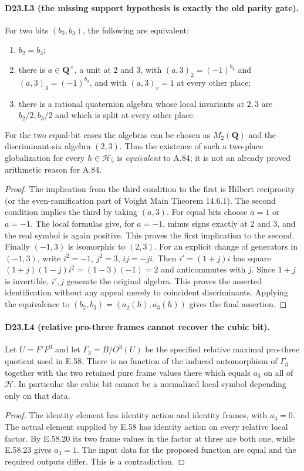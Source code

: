 \paragraph{D23.L3 (the missing support hypothesis is exactly the old parity gate).}
For two bits $(b_2,b_3)$, the following are equivalent:
\begin{enumerate}
\item $b_2=b_3$;
\item there is $a\in\mathbf Q^\times$, a unit at $2$ and $3$, with
$(a,3)_2=(-1)^{b_2}$ and $(a,3)_3=(-1)^{b_3}$, and with
$(a,3)_v=1$ at every other place;
\item there is a rational quaternion algebra whose local invariants
at $2,3$ are $b_2/2,b_3/2$ and which is split at every other place.
\end{enumerate}
For the two equal-bit cases the algebras can be chosen as
$M_2(\mathbf Q)$ and the discriminant-six algebra $(2,3)$.
Thus the existence of such a two-place globalization for every
$h\in\mathcal H_5$ is \emph{equivalent} to A.84; it is not an
already proved arithmetic reason for A.84.
\begin{proof}
The implication from the third condition to the first is Hilbert
reciprocity (or the even-ramification part of Voight Main Theorem
14.6.1). The second condition implies the third by taking $(a,3)$.
For equal bits choose $a=1$ or $a=-1$. The local formulas give,
for $a=-1$, minus signs exactly at $2$ and $3$, and the real symbol
is again positive. This proves the first implication to the second.
Finally $(-1,3)$ is isomorphic to $(2,3)$. For an explicit change
of generators in $(-1,3)$, write $i^2=-1$, $j^2=3$, $ij=-ji$.
Then $i'=(1+j)i$ has square
$(1+j)(1-j)i^2=(1-3)(-1)=2$ and anticommutes with $j$.
Since $1+j$ is invertible, $i',j$ generate the original algebra.
This proves the asserted identification without any appeal merely
to coincident discriminants. Applying the equivalence to
$(b_2,b_3)=(a_2(h),a_3(h))$ gives the final assertion.
\end{proof}

\paragraph{D23.L4 (relative pro-three frames cannot recover the cubic bit).}
Let $U=F'F^3$ and let $\Gamma_3=B/O^3(U)$ be the specified
relative maximal pro-three quotient used in E.58. There is no
function of the induced automorphism of $\Gamma_3$ together with
the two retained pure frame values there which equals $a_3$ on
all of $\mathcal H$. In particular the cubic bit cannot be a
normalized local symbol depending only on that data.
\begin{proof}
The identity element has identity action and identity frames, with
$a_3=0$. The actual element supplied by E.58 has identity action
on every relative local factor. By E.58.20 its two frame values
in the factor at three are both one, while E.58.23 gives $a_3=1$.
The input data for the proposed function are equal and the
required outputs differ. This is a contradiction.
\end{proof}

